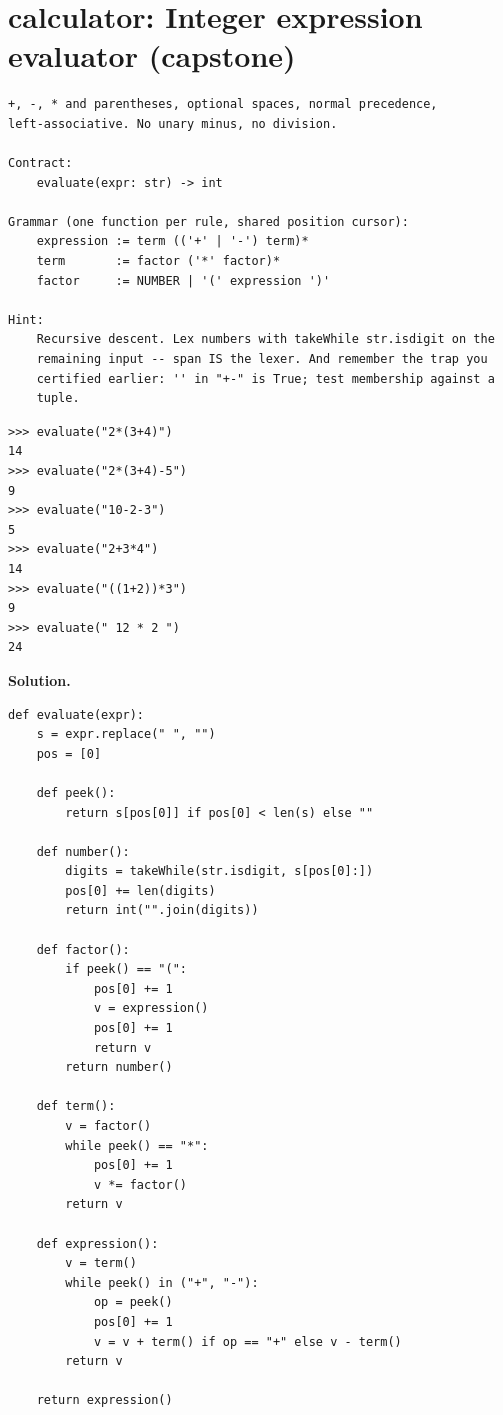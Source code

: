 \documentclass[10pt,letterpaper]{book}
\begin{document}
\section{calculator: Integer expression evaluator (capstone)}
\begin{lstlisting}[style=ex]
+, -, * and parentheses, optional spaces, normal precedence,
left-associative. No unary minus, no division.

Contract:
    evaluate(expr: str) -> int

Grammar (one function per rule, shared position cursor):
    expression := term (('+' | '-') term)*
    term       := factor ('*' factor)*
    factor     := NUMBER | '(' expression ')'

Hint:
    Recursive descent. Lex numbers with takeWhile str.isdigit on the
    remaining input -- span IS the lexer. And remember the trap you
    certified earlier: '' in "+-" is True; test membership against a
    tuple.
\end{lstlisting}
\begin{lstlisting}[style=ex]
>>> evaluate("2*(3+4)")
14
>>> evaluate("2*(3+4)-5")
9
>>> evaluate("10-2-3")
5
>>> evaluate("2+3*4")
14
>>> evaluate("((1+2))*3")
9
>>> evaluate(" 12 * 2 ")
24
\end{lstlisting}
\noindent\textbf{Solution.}
\begin{lstlisting}[style=code]
def evaluate(expr):
    s = expr.replace(" ", "")
    pos = [0]

    def peek():
        return s[pos[0]] if pos[0] < len(s) else ""

    def number():
        digits = takeWhile(str.isdigit, s[pos[0]:])
        pos[0] += len(digits)
        return int("".join(digits))

    def factor():
        if peek() == "(":
            pos[0] += 1
            v = expression()
            pos[0] += 1
            return v
        return number()

    def term():
        v = factor()
        while peek() == "*":
            pos[0] += 1
            v *= factor()
        return v

    def expression():
        v = term()
        while peek() in ("+", "-"):
            op = peek()
            pos[0] += 1
            v = v + term() if op == "+" else v - term()
        return v

    return expression()
\end{lstlisting}
\end{document}
